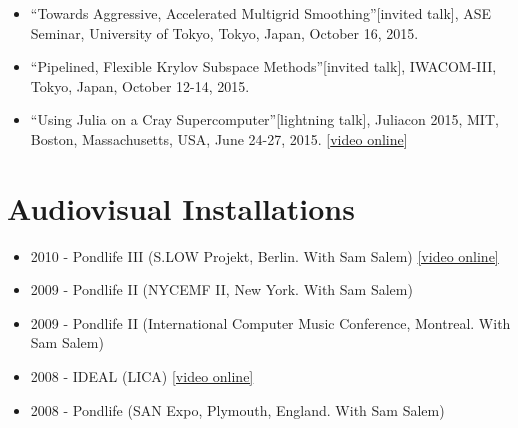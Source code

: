 \documentclass[12pt]{article}
\begin{document}
\begin{itemize}
  \item ``Towards Aggressive, Accelerated Multigrid Smoothing''[invited talk], ASE Seminar, University of Tokyo, Tokyo, Japan, October 16, 2015.
  \item ``Pipelined, Flexible Krylov Subspace Methods''[invited talk], IWACOM-III, Tokyo, Japan, October 12-14, 2015.
  \item ``Using Julia on a Cray Supercomputer''[lightning talk], Juliacon 2015, MIT, Boston, Massachusetts, USA, June 24-27, 2015. [\href{https://www.youtube.com/watch?v=NwyKz2KLdtY}{video online}]
\end{itemize}

%
\section*{Audiovisual Installations}
\begin{itemize}
\item 2010 - Pondlife III (S.LOW Projekt, Berlin. With Sam Salem) {\href{http://vimeo.com/14878086}{[video online]}}
\item 2009 - Pondlife II (NYCEMF II, New York. With Sam Salem)
\item 2009 - Pondlife II (International Computer Music Conference, Montreal. With Sam Salem)
\item 2008 - IDEAL (LICA) {\href{http://vimeo.com/5741743}{[video online]}}
\item 2008 - Pondlife (SAN Expo, Plymouth, England. With Sam Salem)
\end{itemize}
\end{document}
